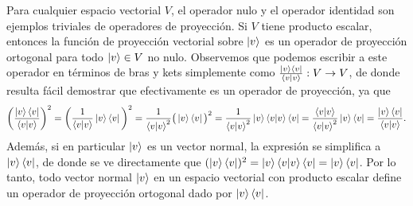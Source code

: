 \documentclass[12pt,dvipsnames]{article}
\begin{document}
\vspace{3mm}
Para cualquier espacio vectorial $V$, el operador nulo y el operador identidad son ejemplos triviales de operadores de proyección. Si $V$ tiene producto escalar, entonces la función de proyección vectorial sobre $\ket{v}$ es un operador de proyección ortogonal para todo $\ket{v}\in V$ no nulo. Observemos que podemos escribir a este operador en términos de bras y kets simplemente como $\frac{\ket{v}\bra{v}}{\braket{v|v}}:V\to V$, de donde resulta fácil demostrar que efectivamente es un operador de proyección, ya que \[
    \bigg( \frac{\ket{v}\bra{v}}{\braket{v|v}}\bigg)^2=\bigg(\frac{1}{\braket{v|v}}\ket{v}\bra{v}\bigg)^2=\frac{1}{\braket{v|v}^2}\big(\ket{v}\bra{v}\big)^2=\frac{1}{\braket{v|v}^2}\ket{v}\braket{v|v}\bra{v}=\frac{\braket{v|v}}{\braket{v|v}^2}\ket{v}\bra{v}=\frac{\ket{v}\bra{v}}{\braket{v|v}}.
\] Además, si en particular $\ket{v}$ es un vector normal, la expresión se simplifica a $\ket{v}\bra{v}$, de donde se ve directamente que $(\ket{v}\bra{v})^2=\ket{v}\braket{v|v}\bra{v}=\ket{v}\bra{v}$. Por lo tanto, todo vector normal $\ket{v}$ en un espacio vectorial con producto escalar define un operador de proyección ortogonal dado por $\ket{v}\bra{v}$.
\end{document}
